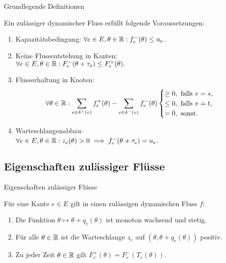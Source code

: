 \begin{frame}{Grundlegende Definitionen}
	\begin{definition}
		Ein zulässiger dynamischer Fluss erfüllt folgende Voraussetzungen:
		\begin{enumerate}[label=(F\arabic*)]
			\pause\item\label{def-feasible-flow-capacity} Kapazitätsbedingung: $\forall e\in E, \theta\in\mathbb{R}: f_e^-(\theta)\leq u_e$.
			\pause\item\label{def-feasible-flow-no-negative-flow} Keine Flussentstehung in Kanten:\\ $\forall e\in E, \theta\in\mathbb{R}: F_e^-(\theta + \tau_e) \leq F_e^+(\theta).$
			\pause\item\label{def-feasible-flow-no-flow-at-node} Flusserhaltung in Knoten:
			\[
			\forall\theta\in\mathbb{R}: \sum_{e\in\delta^+(v)}f^+_e(\theta) - \sum_{e\in\delta^-(v)} f_e^-(\theta) \begin{cases}
				\geq 0, \text{ falls $v=s$,}\\
				\leq 0, \text{ falls $v=t$,}\\
				= 0, \text{ sonst.}
			\end{cases}\]
			\pause\item\label{def-feasible-flow-queue-with-capacity} Warteschlangenabbau:\\
			$\forall e\in E, \theta\in\mathbb{R}: z_e(\theta) > 0 \implies f_e^-(\theta + \tau_e) = u_e$.
		\end{enumerate}
	\end{definition}
\end{frame}

\subsection{Eigenschaften zulässiger Flüsse}
\begin{frame}{Eigenschaften zulässiger Flüsse}
	\begin{proposition}\label{prop-feasible-flow}
		Für eine Kante $e\in E$ gilt in einen zulässigen dynamischen Fluss $f$:
		\begin{enumerate}[label=(\roman*)]
			\item\label{prop-feasible-flow-T-mon-inc-cont} Die Funktion $\theta \mapsto \theta + q_e(\theta)$ ist monoton wachsend und stetig.
			\item\label{prop-feasible-flow-positive-queue} Für alle $\theta\in\mathbb{R}$ ist die Warteschlange $z_e$ auf $(\theta, \theta + q_e(\theta))$ positiv.
			\item\label{prop-feasible-flow-det-outflow} Zu jeder Zeit $\theta\in\mathbb{R}$ gilt $F_e^+(\theta) = F_e^-(T_e(\theta))$.
		\end{enumerate}
	\end{proposition}
\end{frame}

